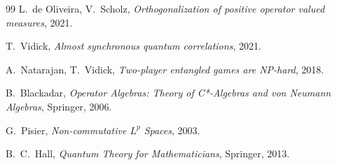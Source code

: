\documentclass{article}
\theoremstyle{remark}
\begin{document}
\begin{thebibliography}{99}
	L.~de Oliveira, V.~Scholz,
	\emph{Orthogonalization of positive operator valued measures},
	2021.

	T.~Vidick,
	\emph{Almost synchronous quantum correlations},
	2021.

	A.~Natarajan, T.~Vidick,
	\emph{Two-player entangled games are NP-hard},
	2018.

	B.~Blackadar,
	\emph{Operator Algebras: Theory of C*-Algebras and von Neumann Algebras},
	Springer, 2006.

	G.~Pisier,
	\emph{Non-commutative $L^p$ Spaces},
	2003.

	B.~C.~Hall,
	\emph{Quantum Theory for Mathematicians},
	Springer, 2013.
\end{thebibliography}
\end{document}
